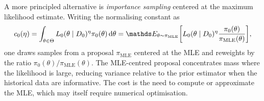 A more principled alternative is \emph{importance sampling} centered at the maximum likelihood estimate. Writing the normalising constant as
\begin{equation*}
    c_0(\eta) = \int_{\theta\in\Theta} L_0(\theta\mid D_0)^\eta \pi_0(\theta)\dd{\theta} = \bE_{\theta\sim\pi_\text{MLE}}\qty[L_0(\theta\mid D_0)^\eta\dfrac{\pi_0(\theta)}{\pi_\text{MLE}(\theta)}],
\end{equation*}
one draws samples from a proposal $\pi_\text{MLE}$ centered at the MLE and reweights by the ratio $\pi_0(\theta)/\pi_\text{MLE}(\theta)$.
The MLE-centred proposal concentrates mass where the likelihood is large, reducing variance relative to the prior estimator when the historical data are informative.
The cost is the need to compute or approximate the MLE, which may itself require numerical optimisation.
